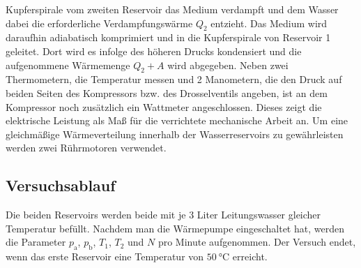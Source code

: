 \documentclass[
  bibliography=totoc,     %
  captions=tableheading,  %
  titlepage=firstiscover, %
]{scrartcl}
\begin{document}
Kupferspirale vom zweiten Reservoir das Medium verdampft und dem Wasser dabei die
erforderliche Verdampfungswärme $Q_2$ entzieht. Das Medium wird daraufhin
adiabatisch komprimiert und in die Kupferspirale von Reservoir 1 geleitet.
Dort wird es infolge des höheren Drucks kondensiert und die aufgenommene Wärmemenge
$Q_2+A$ wird abgegeben. Neben zwei Thermometern, die Temperatur messen und 2
Manometern, die den Druck auf beiden Seiten des Kompressors bzw. des
Drosselventils angeben, ist an dem Kompressor noch zusätzlich ein Wattmeter
angeschlossen. Dieses zeigt die elektrische Leistung als Maß für die verrichtete
mechanische Arbeit an. Um eine gleichmäßige Wärmeverteilung innerhalb der
Wasserreservoirs zu gewährleisten werden zwei Rührmotoren verwendet.

\subsection{Versuchsablauf}
\label{sec:versuchsablauf}
Die beiden Reservoirs werden beide mit je 3 Liter Leitungswasser
gleicher Temperatur befüllt. Nachdem man die Wärmepumpe eingeschaltet hat, werden
die Parameter $p_{\mathup{a}}$, $p_{\mathup{b}}$, $T_1$, $T_2$ und $N$ pro Minute
aufgenommen. Der Versuch endet, wenn das erste Reservoir eine Temperatur von
$\SI{50}{\celsius}$ erreicht.
\end{document}
